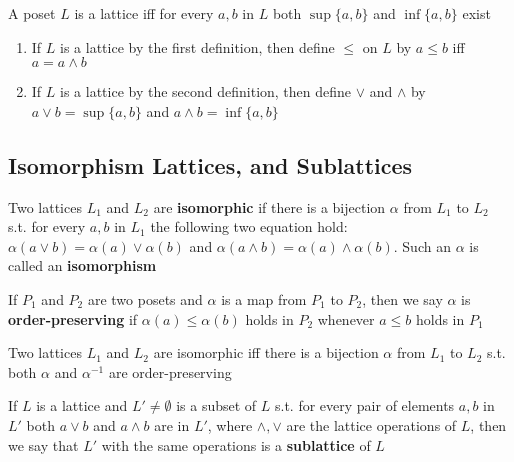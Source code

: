 \documentclass[11pt]{article}
\begin{document}
\begin{definition}[]
A poset \(L\) is a lattice iff for every \(a,b\) in \(L\) both \(\sup\{a,b\}\)
and \(\inf\{a,b\}\) exist
\end{definition}

\begin{enumerate}
\item If \(L\) is a lattice by the first definition, then define \(\le\) on \(L\)
by \(a\le b\) iff \(a=a\wedge b\)
\item If \(L\) is a lattice by the second definition, then define \(\vee\) and
\(\wedge\) by \(a\vee b=\sup\{a,b\}\) and \(a\wedge b=\inf\{a,b\}\)
\end{enumerate}


\subsection{Isomorphism Lattices, and Sublattices}
\label{sec:orgaf64f00}
\begin{definition}[]
Two lattices \(L_1\) and \(L_2\) are \textbf{isomorphic} if there is a bijection
\(\alpha\) from \(L_1\) to \(L_2\) s.t. for every \(a,b\) in \(L_1\) the following two
equation hold: \(\alpha(a\vee b)=\alpha(a)\vee\alpha(b)\) and 
\(\alpha(a\wedge b)=\alpha(a)\wedge\alpha(b)\). Such an \(\alpha\) is called an \textbf{isomorphism}
\end{definition}

\begin{definition}[]
If \(P_1\) and \(P_2\) are two posets and \(\alpha\) is a map from \(P_1\) to \(P_2\), then we
say \(\alpha\) is \textbf{order-preserving} if \(\alpha(a)\le\alpha(b)\) holds in \(P_2\) whenever
\(a\le b\) holds in \(P_1\)
\end{definition}

\begin{theorem}[]
Two lattices \(L_1\) and \(L_2\) are isomorphic iff there is a bijection \(\alpha\) from
\(L_1\) to \(L_2\) s.t. both \(\alpha\) and \(\alpha^{-1}\) are order-preserving
\end{theorem}

\begin{definition}[]
If \(L\) is a lattice and \(L'\neq\emptyset\) is a subset of \(L\) s.t. for every
pair of elements \(a,b\) in \(L'\) both \(a\vee b\) and \(a\wedge b\) are in
\(L'\), where \(\wedge,\vee\) are the lattice operations of \(L\), then we say
that \(L'\) with the same operations is a \textbf{sublattice} of \(L\)
\end{definition}
\end{document}
